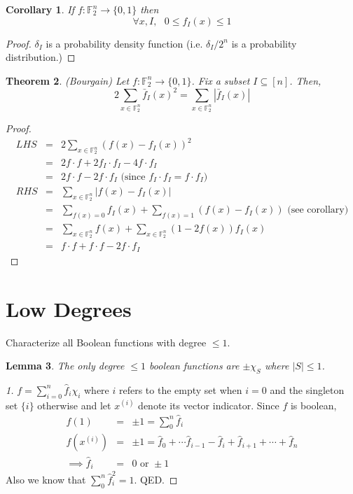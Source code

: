 \documentclass{sig-alternate}
\newtheorem{theorem}{Theorem}[section]
\newtheorem{lemma}[theorem]{Lemma}
\newtheorem{corollary}[theorem]{Corollary}
\newenvironment{problem}[1][Problem]{\begin{trivlist}
\item[\hskip \labelsep {\bfseries #1}]}{\end{trivlist}}
\begin{document}
\begin{corollary}
If $f:\mathbb{F}_2^n \rightarrow \{0,1\}$ then \[\forall x,I,\mbox{  } 0\leq f_I(x) \leq 1\]
\end{corollary}
\begin{proof}
$\delta_I$ is a probability density function (i.e. $\delta_I/2^n$ is a probability distribution.)
\end{proof}

\begin{theorem}
(Bourgain) Let $f:\mathbb{F}_2^n\rightarrow\{0,1\}$. Fix a subset $I\subseteq [n]$. Then,
\[ 2\sum_{x\in\mathbb{F}_2^n}\bar{f}_I(x)^2 =   \sum_{x\in\mathbb{F}_2^n}|\bar{f}_I(x)| \]
\end{theorem}

\begin{proof}
\begin{eqnarray*}
LHS &=& 2\sum_{x\in\mathbb{F}_2^n}(f(x) - f_I(x))^2 \\
        &=& 2f\cdot f + 2f_I\cdot f_I - 4f\cdot f_I  \\
        &=& 2f\cdot f - 2f\cdot f_I \mbox{  (since }f_I \cdot f_I = f \cdot f_I \mbox{)}  \\
 RHS &=& \sum_{x\in\mathbb{F}_2^n}|f(x) - f_I(x)|  \\
 	 &=& \sum_{f(x) = 0} f_I(x) + \sum_{f(x) = 1} (f(x) - f_I(x))  \mbox{ (see corollary)}  \\
	 &=&  \sum_{x\in\mathbb{F}_2^n}f(x) + \sum_{x\in\mathbb{F}_2^n}(1-2f(x))f_I(x)  \\
	 &=&  f\cdot f + f\cdot f - 2f\cdot f_I 
\end{eqnarray*}
\end{proof}
\newpage
\section{Low Degrees}
\begin{problem}
Characterize all Boolean functions with degree $\leq 1$.
\end{problem}

\begin{lemma}
The only degree $\leq 1$ boolean functions are $\pm \chi_S$ where $|S| \leq 1$. 
\end{lemma}

\begin{proof}[1]
$f = \sum_{i=0}^{n} \hat{f}_i\chi_i$ where $i$ refers to the empty set when $i=0$ and the singleton set $\{i\}$ otherwise and let $x^{(i)}$ denote its vector indicator. Since $f$ is boolean,
\begin{eqnarray*} 
f(1) & = & \pm 1 = \sum_{0}^{n} \hat{f}_i \\
f(x^{(i)}) & = & \pm 1 = \hat{f}_0 + \cdots \hat{f}_{i-1} - \hat{f}_i + \hat{f}_{i+1} + \cdots + \hat{f}_n \\
\implies \hat{f}_i & = & 0 \mbox{ or } \pm 1
\end{eqnarray*}
Also we know that $\sum_{0}^{n} \hat{f}_i^2 = 1$. QED.
\end{proof}
\end{document}
